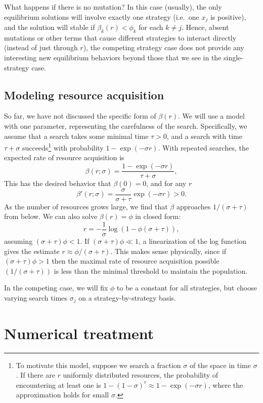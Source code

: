 \documentclass[12pt, leqno]{article} %
\begin{document}
What happens if there is no mutation?  In this case (usually), the
only equilibrium solutions will involve exactly one strategy (i.e.~one
$x_j$ is positive), and the solution will stable if $\beta_k(r) <
\phi_k$ for each $k \neq j$.  Hence, absent mutations or other terms
that cause different strategies to interact directly (instead of just
through $r$), the competing strategy case does not provide any
interesting new equilibrium behaviors beyond those that we see in the
single-strategy case.

\subsection{Modeling resource acquisition}

So far, we have not discussed the specific form of $\beta(r)$.
We will use a model with one parameter, representing the carefulness
of the search.  Specifically, we assume that a search takes
some minimal time $\tau > 0$, and a search with time $\tau + \sigma$
succeeds\footnote{%
  To motivate this model, suppose we search a fraction $\sigma$
  of the space in time $\sigma$.  If there are $r$ uniformly
  distributed resources, the probability of encountering at least
  one is $1-(1-\sigma)^r \approx 1-\exp(-\sigma r)$, where the
  approximation holds for small $\sigma$.
}
with probability $1-\exp(-\sigma r)$.
With repeated searches, the expected rate of resource acquisition is
\[
  \beta(r; \sigma) = \frac{1-\exp(-\sigma r)}{\tau+\sigma},
\]
This has the desired behavior that $\beta(0) = 0$, and for any $r$
\[
  \beta'(r; \sigma) = \frac{\sigma}{\sigma + \tau} \exp(-\sigma r) > 0.
\]
As the number of resources grows large, we find that
$\beta$ approaches $1/(\sigma+\tau)$ from below.
We can also solve $\beta(r) = \phi$ in closed form:
\[
  r = -\frac{1}{\sigma} \log(1-\phi (\sigma + \tau)),
\]
assuming $(\sigma + \tau) \phi < 1$.  If $(\sigma + \tau) \phi \ll 1$,
a linearization of the log function gives the estimate
$r \approx \phi/(\sigma+\tau)$.
This makes sense physically, since if
$(\sigma + \tau) \phi > 1$ then the maximal rate of resource acquisition
possible $(1/(\sigma+\tau))$ is less than the minimal threshold to maintain
the population.

In the competing case, we will fix $\phi$ to be a constant for all
strategies, but choose varying search times $\sigma_j$ on
a strategy-by-strategy basis.

\section{Numerical treatment}
\end{document}

